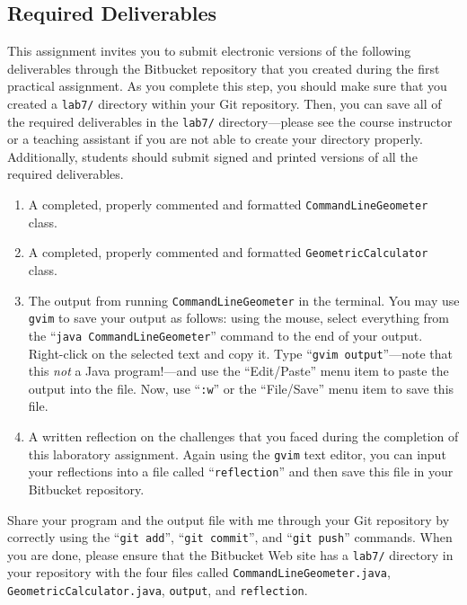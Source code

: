 \vspace*{-.1in}
\subsection*{Required Deliverables}

This assignment invites you to submit electronic versions of the following deliverables through the Bitbucket repository
that you created during the first practical assignment.  As you complete this step, you should make sure that you
created a {\tt lab7/} directory within your Git repository.  Then, you can save all of the required deliverables in the
{\tt lab7/} directory---please see the course instructor or a teaching assistant if you are not able to create your
directory properly.  Additionally, students should submit signed and printed versions of all the required deliverables.

\vspace*{-.05in}
\begin{enumerate}
    \setlength{\itemsep}{0pt}

  \item A completed, properly commented and formatted {\tt CommandLineGeometer} class.

  \item A completed, properly commented and formatted {\tt GeometricCalculator} class.

  \item The output from running {\tt CommandLineGeometer} in the terminal. You may use {\tt gvim} to save
    your output as follows: using the mouse, select everything from the ``{\tt java CommandLineGeometer}'' command
    to the end of your output.  Right-click on the selected text and copy it.  Type ``{\tt gvim output}''---note
    that this {\em not} a Java program!---and use the ``Edit/Paste'' menu item to paste the output into the file.
    Now, use ``{\tt :w}'' or the ``File/Save'' menu item to save this file.

  \item A written reflection on the challenges that you faced during the completion of this laboratory assignment.
    Again using the {\tt gvim} text editor, you can input your reflections into a file called ``{\tt reflection}''
    and then save this file in your Bitbucket repository.

\end{enumerate}
\vspace*{-.05in}

Share your program and the output file with me through your Git repository by correctly using the ``{\tt git add}'',
``{\tt git commit}'', and ``{\tt git push}'' commands. When you are done, please ensure that the Bitbucket Web site has
a {\tt lab7/} directory in your repository with the four files called {\tt CommandLineGeometer.java}, {\tt
GeometricCalculator.java}, {\tt output}, and {\tt reflection}.

